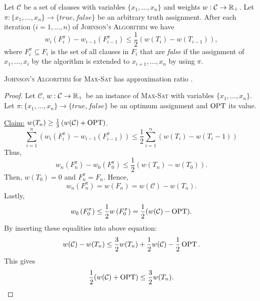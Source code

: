\documentclass[../skript.tex]{subfiles}
\begin{document}
\begin{lemma} %
\label{thm:28}
Let $\mathcal{C}$ be a set of clauses with variables $\{ x_1, \ldots, x_n \}$ and weights $w : \mathcal{C} \to \mathbb{R}_+$. Let $\pi : \{ x_1, \ldots, x_n\} \to \{ \textit{true}, \textit{false} \}$ be an arbitrary truth assignment.
After each iteration ($i = 1, \ldots, n$) of \textsc{Johnson's Algorithm} we have
\[
	w_i\left( F_i^\pi \right) - w_{i-1} \left( F_{i-1}^\pi \right) \leq \frac{1}{2} \left( w(T_i) - w(T_{i-1}) \right),
\]
where $F_i^\pi \subseteq F_i$ is the set of all clauses in $F_i$ that are \textit{false} if the assignment of $x_1, \ldots, x_i$ by the algorithm is extended to $x_{i+1}, \ldots, x_n$ by using $\pi$.
\end{lemma}
\begin{theorem} %
\label{thm:29}
\textsc{Johnson's Algorithm} for \textsc{Max-Sat} has approximation ratio . 
\end{theorem}
\begin{proof}
Let $\mathcal{C}$, $w : \mathcal{C} \to \mathbb{R}_+$ be an instance of \textsc{Max-Sat} with variables $\{ x_1, \ldots, x_n \}$. Let $\pi : \{ x_1, \ldots, x_n\} \to \{ \textit{true}, \textit{false} \}$ be an optimum assignment and $\operatorname{OPT}$ its value.

\underline{Claim:} $w(T_n) \geq \frac{1}{3} \left( w(\mathcal{C}) + \operatorname{OPT} \right)$. \\
\[
\sum_{i=1}^n \left( w_i \left(F_i^\pi \right) - w_{i-1} \left( F_{i-1}^\pi \right) \right) \leq \frac{1}{2} \sum_{i=1}^n \left( w(T_i) - w(T_i-1) \right)
\]
Thus,
\[
	w_n\left(F_n^\pi\right) - w_0\left(F_0^\pi\right) \leq \frac{1}{2} \left( w(T_n) - w(T_0) \right).
\]
Then, $w(T_0) = 0$ and $F_n^\pi = F_n$. Hence,
\[
	w_n \left( F_n^\pi \right) = w(F_n) = w(\mathcal{C}) - w(T_n).
\]
Lastly,
\[
	w_0 \left( F_0^\pi \right) \leq \frac{1}{2} w \left( F_0^\pi \right) = \frac{1}{2} (w(\mathcal{C}) - \operatorname{OPT}).
\]
By inserting these equalities into above equation:
\[
	w(\mathcal{C}) - w(T_n) \leq \frac{3}{2} w(T_n) + \frac{1}{2} w(\mathcal{C}) - \frac{1}{2} \operatorname{OPT}. 
\]
This gives
\[
	\frac{1}{2} ( w(\mathcal{C}) + \operatorname{OPT} ) \leq \frac{3}{2} w(T_n). 
\]
\end{proof}
\end{document}
